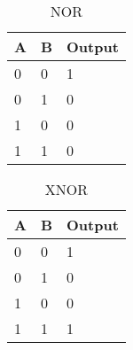 \documentclass[12pt, letterpaper, titlepage]{article}
\begin{document}
\begin{table}[h]
\centering\caption{NOR}
\begin{tabular}{|l|l|l|}
\hline
A & B & Output\\
\hline
0 & 0 & 1\\
\hline
0 & 1 & 0\\
\hline
1 & 0 & 0\\
\hline
1 & 1 & 0\\
\hline
\end{tabular}
\end{table}
\begin{table}[h]
\centering\caption{XNOR}
\begin{tabular}{|l|l|l|}
\hline
A & B & Output\\
\hline
0 & 0 & 1\\
\hline
0 & 1 & 0\\
\hline
1 & 0 & 0\\
\hline
1 & 1 & 1\\
\hline
\end{tabular}
\end{table}
\end{document}
